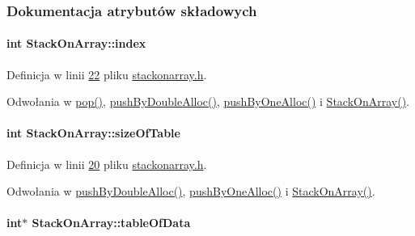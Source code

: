\subsubsection{Dokumentacja atrybutów składowych}
\hypertarget{class_stack_on_array_a48bd7e27ae4baae328485c60f7773ca7}{
\paragraph[{index}]{\setlength{\rightskip}{0pt plus 5cm}int Stack\-On\-Array\-::index}}\label{class_stack_on_array_a48bd7e27ae4baae328485c60f7773ca7}


Definicja w linii \hyperlink{stackonarray_8h_source_l00022}{22} pliku \hyperlink{stackonarray_8h_source}{stackonarray.\-h}.



Odwołania w \hyperlink{stackonarray_8cpp_source_l00064}{pop()}, \hyperlink{stackonarray_8cpp_source_l00041}{push\-By\-Double\-Alloc()}, \hyperlink{stackonarray_8cpp_source_l00019}{push\-By\-One\-Alloc()} i \hyperlink{stackonarray_8cpp_source_l00011}{Stack\-On\-Array()}.

\hypertarget{class_stack_on_array_ac7ab7f17614fd1692138317af349da90}{
\paragraph[{size\-Of\-Table}]{\setlength{\rightskip}{0pt plus 5cm}int Stack\-On\-Array\-::size\-Of\-Table}}\label{class_stack_on_array_ac7ab7f17614fd1692138317af349da90}


Definicja w linii \hyperlink{stackonarray_8h_source_l00020}{20} pliku \hyperlink{stackonarray_8h_source}{stackonarray.\-h}.



Odwołania w \hyperlink{stackonarray_8cpp_source_l00041}{push\-By\-Double\-Alloc()}, \hyperlink{stackonarray_8cpp_source_l00019}{push\-By\-One\-Alloc()} i \hyperlink{stackonarray_8cpp_source_l00011}{Stack\-On\-Array()}.

\hypertarget{class_stack_on_array_a5c8979502e9a60271beebdd9e33d5822}{
\paragraph[{table\-Of\-Data}]{\setlength{\rightskip}{0pt plus 5cm}int$\ast$ Stack\-On\-Array\-::table\-Of\-Data}}\label{class_stack_on_array_a5c8979502e9a60271beebdd9e33d5822}


